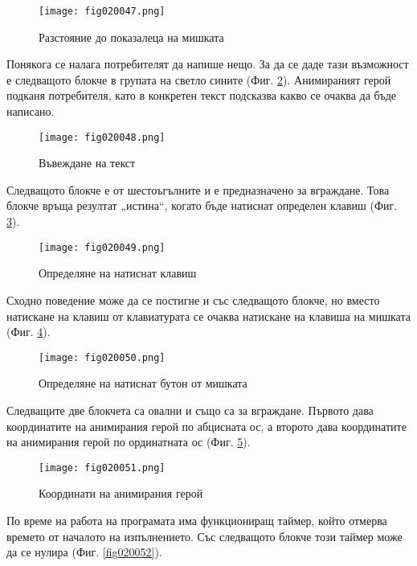 \begin{figure}[H]
  \centering
  \texttt{[image: fig020047.png]}
  \caption{Разстояние до показалеца на мишката}
\label{fig020047}
\end{figure}

Понякога се налага потребителят да напише нещо. За да се даде тази възможност е следващото блокче в групата на светло сините (Фиг. \ref{fig020048}). Анимираният герой подканя потребителя, като в конкретен текст подсказва какво се очаква да бъде написано. 

\begin{figure}[H]
  \centering
  \texttt{[image: fig020048.png]}
  \caption{Въвеждане на текст}
\label{fig020048}
\end{figure}

Следващото блокче е от шестоъгълните и е предназначено за вграждане. Това блокче връща резултат „истина“, когато бъде натиснат определен клавиш (Фиг. \ref{fig020049}).

\begin{figure}[H]
  \centering
  \texttt{[image: fig020049.png]}
  \caption{Определяне на натиснат клавиш}
\label{fig020049}
\end{figure}

Сходно поведение може да се постигне и със следващото блокче, но вместо натискане на клавиш от клавиатурата се очаква натискане на клавиша на мишката (Фиг. \ref{fig020050}).

\begin{figure}[H]
  \centering
  \texttt{[image: fig020050.png]}
  \caption{Определяне на натиснат бутон от мишката}
\label{fig020050}
\end{figure}

Следващите две блокчета са овални и също са за вграждане. Първото дава координатите на анимирания герой по абцисната ос, а второто дава координатите на анимирания герой по ординатната ос (Фиг. \ref{fig020051}).

\begin{figure}[H]
  \centering
  \texttt{[image: fig020051.png]}
  \caption{Координати на анимирания герой}
\label{fig020051}
\end{figure}

По време на работа на програмата има функциониращ таймер, който отмерва времето от началото на изпълнението. Със следващото блокче този таймер може да се нулира (Фиг. \ref{fig020052}).

